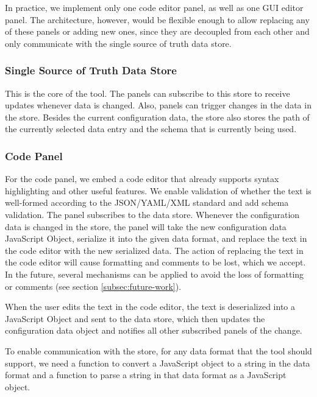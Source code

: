 In practice, we implement only one code editor panel, as well as one GUI editor panel.
The architecture, however, would be flexible enough to allow replacing any of these panels or adding new ones, since they are decoupled from each other and only communicate with the single source of truth data store.



\subsubsection{Single Source of Truth Data Store}
This is the core of the tool.
The panels can subscribe to this store to receive updates whenever data is changed.
Also, panels can trigger changes in the data in the store.
Besides the current configuration data, the store also stores the path of the currently selected data entry and the schema that is currently being used.


\subsubsection{Code Panel}\label{subsubsec:design_text_editor_panel}
For the code panel, we embed a code editor that already supports syntax highlighting and other useful features.
We enable validation of whether the text is well-formed according to the JSON/YAML/XML standard and add schema validation.
The panel subscribes to the data store.
Whenever the configuration data is changed in the store, the panel will take the new configuration data JavaScript Object, serialize it into the given data format, and replace the text in the code editor with the new serialized data.
The action of replacing the text in the code editor will cause formatting and comments to be lost, which we accept.
In the future, several mechanisms can be applied to avoid the loss of formatting or comments (see section \ref{subsec:future-work}).

When the user edits the text in the code editor, the text is deserialized into a JavaScript Object and sent to the data store, which then updates the configuration data object and notifies all other subscribed panels of the change.

To enable communication with the store, for any data format that the tool should support, we need a function to convert a JavaScript object to a string in the data format and a function to parse a string in that data format as a JavaScript object.

